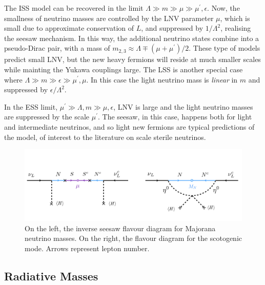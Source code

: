 The ISS model can be recovered in the limit $\Lambda \gg m \gg \mu \gg \mu^\prime, \epsilon$. Now, the smallness of neutrino masses are controlled by the LNV parameter $\mu$, which is small due to approximate conservation of $L$, and suppressed by $1/\Lambda^2$, realising the seesaw mechanism. In this way, the additional neutrino states combine into a pseudo-Dirac pair, with a mass of $m_{2,3} \approx \Lambda \mp (\mu+\mu^\prime)/2$. These type of models predict small LNV, but the new heavy fermions will reside at much smaller scales while mainting the Yukawa couplings large. The LSS is another special case where $\Lambda \gg m \gg \epsilon \gg \mu^\prime,\mu$. In this case the light neutrino mass is \emph{linear} in $m$ and suppressed by $\epsilon/\Lambda^2$. 


In the ESS limit, $\mu^\prime \gg \Lambda, m \gg \mu, \epsilon$, LNV is large and the light neutrino masses are suppressed by the scale $\mu^\prime$. The seesaw, in this case, happens both for light and intermediate neutrinos, and so light new fermions are typical predictions of the model, of interest to the literature on scale sterile neutrinos.

%
\begin{figure}[t]
\centering
\includegraphics[width=\textwidth]{LNV_diagrams.pdf}
\caption[Diagrams for inverse seesaw and scotogenic model.]{On the left, the inverse seesaw flavour diagram for Majorana neutrino masses. On the right, the flavour diagram for the scotogenic mode. Arrows represent lepton number. \label{fig:LNVdiagrams}}
\end{figure}
%
\subsection{Radiative Masses}\label{sec:radiative}

